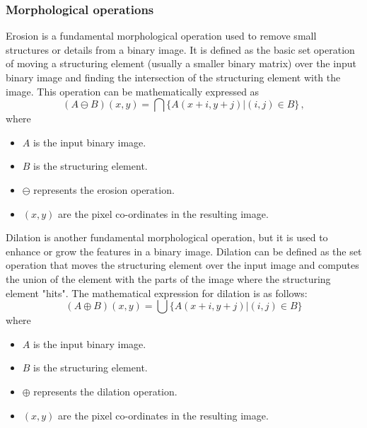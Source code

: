 \subsubsection{Morphological operations}
\label{subsubsec:morphological_operations}
Erosion is a fundamental morphological operation used to remove small structures or details from a binary image. It is defined as the basic set operation of moving a structuring element (usually a smaller binary matrix) over the input binary image and finding the intersection of the structuring element with the image. This operation can be mathematically expressed as
\begin{equation}
    (A \ominus B)(x, y) = \bigcap \{A(x + i, y + j) | (i, j) \in B\}\,,
    \label{eq:erosion}
\end{equation}
where
\begin{itemize}
    \item $A$ is the input binary image.
    \item $B$ is the structuring element.
    \item $\ominus$ represents the erosion operation.
    \item $(x, y)$ are the pixel co-ordinates in the resulting image.
\end{itemize}

Dilation is another fundamental morphological operation, but it is used to enhance or grow the features in a binary image. Dilation can be defined as the set operation that moves the structuring element over the input image and computes the union of the element with the parts of the image where the structuring element "hits". The mathematical expression for dilation is as follows:
\begin{equation}
    (A \oplus B)(x, y) = \bigcup \{A(x + i, y + j) | (i, j) \in B\}
    \label{eq:dilation}
\end{equation}
where
\begin{itemize}
    \item $A$ is the input binary image.
    \item $B$ is the structuring element.
    \item $\oplus$ represents the dilation operation.
    \item $(x, y)$ are the pixel co-ordinates in the resulting image.
\end{itemize}

